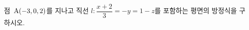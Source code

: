 점~$\mathrm{A}(-3{,}\mkern3mu\mathopen{}0{,}\mkern3mu\mathopen{}2)$를 지나고 직선 $l\colon \dfrac{x+2}{3}=-y=1-z$를 포함하는 평면의 방정식을 구하시오.
